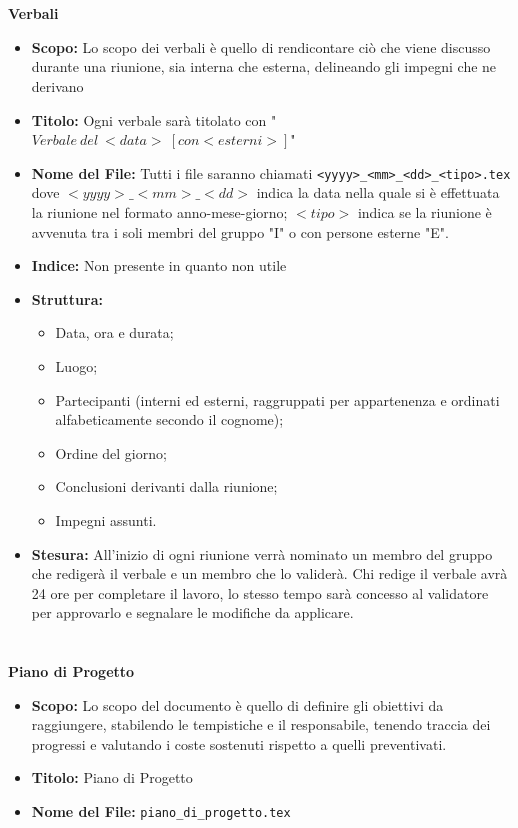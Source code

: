 \documentclass[a4paper, 12pt]{article}
\begin{document}
\paragraph{}\\
\textbf{Verbali}
\begin{itemize}
    \item \textbf{Scopo:} Lo scopo dei verbali è quello di rendicontare ciò che viene discusso durante una riunione, sia interna che esterna, delineando gli impegni che ne derivano
    \item \textbf{Titolo:} Ogni verbale sarà titolato con "$Verbale \ del \ <data> \ [con <esterni>]$"
    \item \textbf{Nome del File:} Tutti i file saranno chiamati \texttt{<yyyy>\_<mm>\_<dd>\_<tipo>.tex} dove $<yyyy>\_<mm>\_<dd>$ indica la data nella quale si è effettuata la riunione nel formato anno-mese-giorno; $<tipo>$ indica se la riunione è avvenuta tra i soli membri del gruppo "I" o con persone esterne "E".
    \item \textbf{Indice:} Non presente in quanto non utile
    \item \textbf{Struttura:}
    \begin{itemize}
        \item Data, ora e durata;
        \item Luogo;
        \item Partecipanti (interni ed esterni, raggruppati per appartenenza e ordinati alfabeticamente secondo il cognome);
        \item Ordine del giorno;
        \item Conclusioni derivanti dalla riunione;
        \item Impegni assunti.
    \end{itemize}
    \item \textbf{Stesura:} All'inizio di ogni riunione verrà nominato un membro del gruppo che redigerà il verbale e un membro che lo validerà. Chi redige il verbale avrà 24 ore per completare il lavoro, lo stesso tempo sarà concesso al validatore per approvarlo e segnalare le modifiche da applicare.
\end{itemize}
\paragraph{}\\
\textbf{Piano di Progetto}
\begin{itemize}
    \item \textbf{Scopo:} Lo scopo del documento è quello di definire gli obiettivi da raggiungere, stabilendo le tempistiche e il responsabile, tenendo traccia dei progressi e valutando i coste sostenuti rispetto a quelli preventivati.
    \item \textbf{Titolo:} Piano di Progetto
    \item \textbf{Nome del File:} \texttt{piano\_di\_progetto.tex}
\end{itemize}
\end{document}
